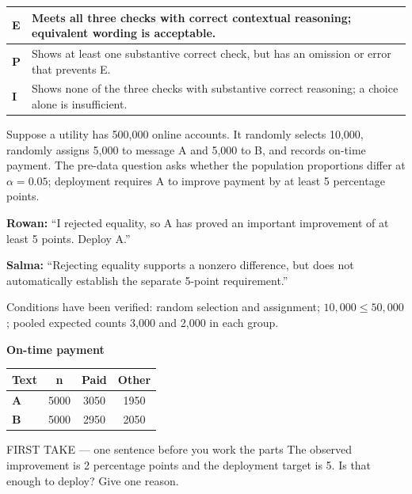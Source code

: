 \documentclass[11pt]{article}
\begin{document}
{\small\renewcommand{\arraystretch}{1.25}
\noindent\begin{tabular}{|p{0.5in}|p{5.9in}|}
\hline
\textbf{E} & Meets all three checks with correct contextual reasoning; equivalent wording is acceptable. \\ \hline
\textbf{P} & Shows at least one substantive correct check, but has an omission or error that prevents E. \\ \hline
\textbf{I} & Shows none of the three checks with substantive correct reasoning; a choice alone is insufficient. \\ \hline
\end{tabular}}

\clearpage
{}

Suppose a utility has 500,000 online accounts. It randomly selects 10,000, randomly assigns 5,000 to message A and 5,000 to B, and records on-time payment. The pre-data question asks whether the population proportions differ at $\alpha=0.05$; deployment requires A to improve payment by at least 5 percentage points.\par\smallskip \textbf{Rowan:} ``I rejected equality, so A has proved an important improvement of at least 5 points. Deploy A.''\par \textbf{Salma:} ``Rejecting equality supports a nonzero difference, but does not automatically establish the separate 5-point requirement.''\par\smallskip Conditions have been verified: random selection and assignment; $10{,}000\leq50{,}000$; pooled expected counts 3,000 and 2,000 in each group.\par
\begin{center}
\textbf{On-time payment}\par\smallskip
\begin{tabular}{|l|c|c|c|}
\hline
\textbf{Text} & \textbf{n} & \textbf{Paid} & \textbf{Other} \\ \hline
\textbf{A} & 5000 & 3050 & 1950 \\ \hline
\textbf{B} & 5000 & 2950 & 2050 \\ \hline
\end{tabular}
\end{center}
\begin{firsttakebox}{FIRST TAKE --- one sentence before you work the parts}
The observed improvement is 2 percentage points and the deployment target is 5. Is that enough to deploy? Give one reason.\par
{}
\end{firsttakebox}
\end{document}
